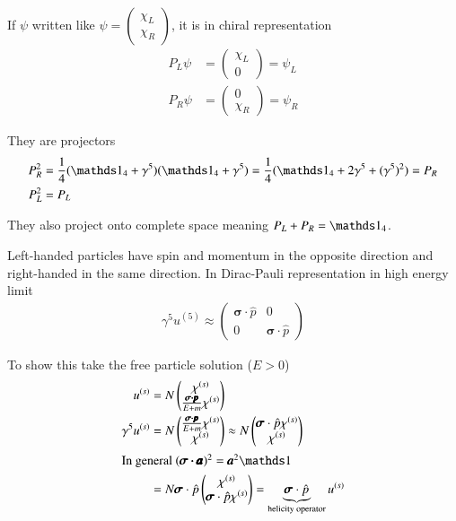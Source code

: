 If $\psi$ written like $\psi = \begin{pmatrix} \chi_L \\ \chi_R \end{pmatrix}$, it is in chiral representation
\begin{align*}
   P_L \psi &= \begin{pmatrix} \chi_L \\ 0\end{pmatrix} = \psi_L \\
   P_R \psi &= \begin{pmatrix} 0 \\ \chi_R \end{pmatrix} = \psi_R
\end{align*}

They are projectors
\begin{align*}
   P_R^2 &= \frac{1}{4} (\id_4 + \gamma^5) (\id_4 + \gamma^5) = \frac{1}{4} (\id_4 + 2 \gamma^5 + (\gamma^5)^2) = P_R \\
   P_L^2 &= P_L
\end{align*}

They also project onto complete space meaning $P_L + P_R = \id_4$.

Left-handed particles have spin and momentum in the opposite direction and right-handed in the same direction. In Dirac-Pauli representation in high energy limit
\begin{align*}
   \gamma^5 u^{(5)} \approx \begin{pmatrix} \pmb{\sigma} \cdot \hat{p} & 0 \\ 0 & \pmb{\sigma} \cdot \hat{p}\end{pmatrix}
\end{align*}

To show this take the free particle solution ($E>0$)
\begin{align*}
   u^{(s)} &= N \begin{pmatrix} \chi^{(s)} \\ \frac{\pmb{\sigma \cdot \pmb{p}}}{E+m} \chi^{(s)}\end{pmatrix} \\
   \gamma^5 u^{(s)} &= N  \begin{pmatrix}  \frac{\pmb{\sigma \cdot \pmb{p}}}{E+m} \chi^{(s)} \\ \chi^{(s)}  \end{pmatrix} \approx N \begin{pmatrix} \pmb{\sigma} \cdot \hat{p} \chi^{(s)} \\ \chi^{(s)} \end{pmatrix} \\
   \shortintertext{In general $(\pmb{\sigma \cdot \pmb{a}})^2 = \pmb{a}^2 \id$} 
   &=  N \pmb{\sigma} \cdot \hat{p} \begin{pmatrix} \chi^{(s)} \\ \pmb{\sigma} \cdot \hat{p} \chi^{(s)} \end{pmatrix}  = \underbrace{\pmb{\sigma} \cdot \hat{p}}_{\text{helicity operator}} u^{(s)} \\
\end{align*}

